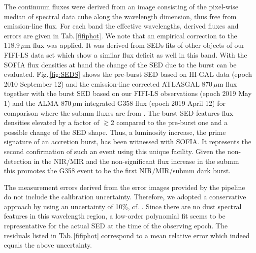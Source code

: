 \documentclass[longauth,usenatbib]{aa}
\begin{document}
The continuum fluxes were derived from an image consisting of the pixel-wise median of spectral data cube along the wavelength dimension, thus free from emission-line flux. For each band the effective wavelengths, derived fluxes and errors are given in Tab.\,\ref{fifiphot}. We note that an empirical correction to the 118.9\,$\mu$m flux was applied. It was derived from SEDs fits of other objects of our FIFI-LS data set which show a similar flux deficit as well in this band.
With the SOFIA flux densities at hand the change of the SED due to the burst can be evaluated.
Fig.\,\ref{fig:SEDS} shows the pre-burst SED based on HI-GAL data (epoch 2010 September 12) and the emission-line corrected ATLASGAL 870\,$\mu$m flux together with the burst SED based on our FIFI-LS observations (epoch 2019 May 1) and the ALMA 870\,$\mu$m integrated G358 flux (epoch 2019 April 12) for comparison where the submm fluxes are from . The burst SED features flux densities elevated by a factor of $\gtrsim$2 compared to the pre-burst one and a possible change of the SED shape. Thus, a luminosity increase, the prime signature of an accretion burst, has been witnessed with SOFIA. It represents the second confirmation of such an event using this unique facility. Given the non-detection in the NIR/MIR and the non-significant flux increase in the submm  this promotes the G358 event to be the first NIR/MIR/submm dark burst.

The measurement errors derived from the error images provided by the pipeline do not include the calibration uncertainty. Therefore, we adopted a conservative approach by using an uncertainty of 10\%, cf. . Since there are no dust spectral features in this wavelength region, a low-order polynomial fit seems to be representative for the actual SED at the time of the observing epoch. The residuals listed in Tab.\,\ref{fifiphot}  correspond to a mean relative error which indeed equals the above uncertainty. 
\end{document}
